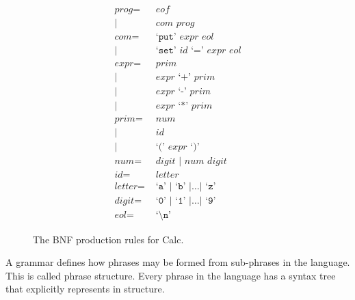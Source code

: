 \documentclass[a4paper, openany]{memoir}
\begin{document}
\begin{figure}[H]
    \begin{align*}
        \textit{prog} =& \textit{ eof} \\
        |\hspace{2pt} & \textit{ com prog} \\
        \textit{com} =& \text{ `}\texttt{put}\text{' } \textit{expr eol} \\
        |\hspace{2pt} & \text{ `}\texttt{set}\text{' } \textit{id} \text{ `}\texttt{=}\text{' } \textit{expr eol} \\
        \textit{expr} =& \textit{  prim} \\
        |\hspace{2pt} & \textit{ expr} \text{ `}\texttt{+}\text{' } \textit{prim} \\
        |\hspace{2pt} & \textit{ expr} \text{ `}\texttt{-}\text{' } \textit{prim} \\
        |\hspace{2pt} & \textit{ expr} \text{ `}\texttt{*}\text{' } \textit{prim} \\
        \textit{prim} =& \textit{ num} \\
        |\hspace{2pt} & \textit{ id} \\
        |\hspace{2pt} & \text{ `}\texttt{(}\text{' } \textit{expr} \text{ `}\texttt{)}\text{'} \\
        \textit{num} =& \textit{ digit } | \textit{ num digit} \\
        \textit{id} =& \textit{ letter} \\
        \textit{letter} =& \text{ `}\texttt{a}\text{' } | \text{ `}\texttt{b}\text{' } | \dots | \text{ `}\texttt{z}\text{' } \\
        \textit{digit} =& \text{ `}\texttt{0}\text{' } | \text{ `}\texttt{1}\text{' } | \dots | \text{ `}\texttt{9}\text{'} \\
        \textit{eol} =& \text{ `}\texttt{\textbackslash n}\text{'}
    \end{align*}
    \caption{The BNF production rules for Calc.}
\end{figure}

A grammar defines how phrases may be formed from sub-phrases in the language. This is called phrase structure. Every phrase in the language has a syntax tree that explicitly represents in structure.
\end{document}
